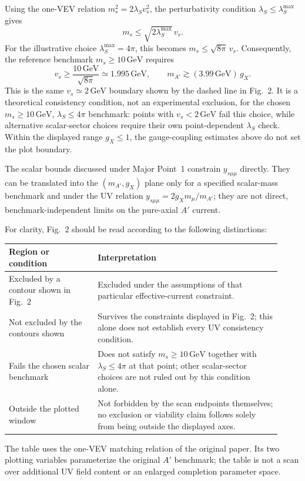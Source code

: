 \documentclass[12pt,a4paper]{article}
\begin{document}
Using the one-VEV relation \(m_s^2=2\lambda_Sv_s^2\), the perturbativity condition \(\lambda_S\leq\lambda_S^{\max}\) gives
\[
m_s\leq\sqrt{2\lambda_S^{\max}}\,v_s.
\]
For the illustrative choice \(\lambda_S^{\max}=4\pi\), this becomes \(m_s\leq\sqrt{8\pi}\,v_s\). Consequently, the reference benchmark \(m_s\geq10\,\mathrm{GeV}\) requires
\[
v_s\geq\frac{10\,\mathrm{GeV}}{\sqrt{8\pi}}
\simeq1.995\,\mathrm{GeV},
\qquad
m_{A'}\gtrsim(3.99\,\mathrm{GeV})\,g_X.
\]
This is the same \(v_s\simeq2\,\mathrm{GeV}\) boundary shown by the dashed line in Fig.~2. It is a theoretical consistency condition, not an experimental exclusion, for the chosen \(m_s\geq10\,\mathrm{GeV}\), \(\lambda_S\leq4\pi\) benchmark: points with \(v_s<2\,\mathrm{GeV}\) fail this choice, while alternative scalar-sector choices require their own point-dependent \(\lambda_S\) check. Within the displayed range \(g_X\leq1\), the gauge-coupling estimates above do not set the plot boundary.


\medskip
{}

The scalar bounds discussed under Major Point~1 constrain \(y_{s\mu\mu}\) directly. They can be translated into the \((m_{A'},g_X)\) plane only for a specified scalar-mass benchmark and under the UV relation \(y_{s\mu\mu}=2g_Xm_\mu/m_{A'}\); they are not direct, benchmark-independent limits on the pure-axial \(A'\) current.

For clarity, Fig.~2 should be read according to the following distinctions:
\begin{center}
\small
\begin{tabular}{p{0.30\linewidth}p{0.62\linewidth}}
\hline
Region or condition & Interpretation \\
\hline
Excluded by a contour shown in Fig.~2 & Excluded under the assumptions of that particular effective-current constraint. \\
Not excluded by the contours shown & Survives the constraints displayed in Fig.~2; this alone does not establish every UV consistency condition. \\
Fails the chosen scalar benchmark & Does not satisfy \(m_s\geq10\,\mathrm{GeV}\) together with \(\lambda_S\leq4\pi\) at that point; other scalar-sector choices are not ruled out by this condition alone. \\
Outside the plotted window & Not forbidden by the scan endpoints themselves; no exclusion or viability claim follows solely from being outside the displayed axes. \\
\hline
\end{tabular}
\end{center}
The table uses the one-VEV matching relation of the original paper. Its two plotting variables parameterize the original \(A'\) benchmark; the table is not a scan over additional UV field content or an enlarged completion parameter space.
\end{document}
